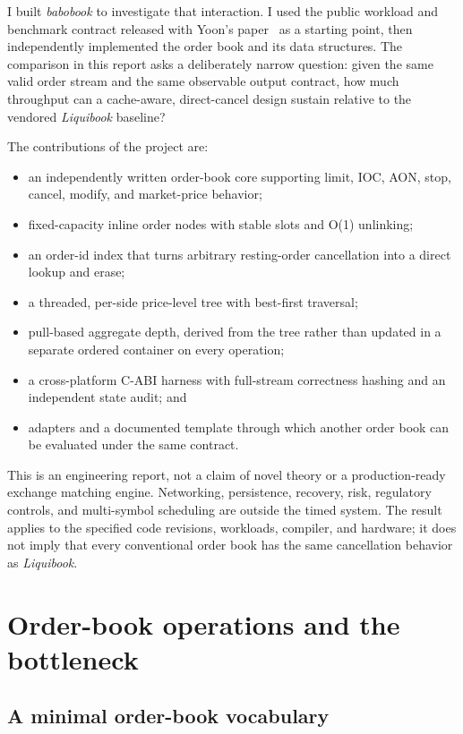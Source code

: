 \documentclass[10pt,twocolumn]{article}
\begin{document}
I built \textit{babobook} to investigate that interaction.  I used the public workload and
benchmark contract released with Yoon's paper~\cite{yoon2026} as a starting point, then
independently implemented the order book and its data
structures.  The comparison in this report asks a deliberately narrow question:
given the same valid order stream and the same observable output contract, how
much throughput can a cache-aware, direct-cancel design sustain relative to the
vendored \textit{Liquibook} baseline?

The contributions of the project are:
\begin{itemize}
  \item an independently written order-book core supporting limit, IOC, AON,
        stop, cancel, modify, and market-price behavior;
  \item fixed-capacity inline order nodes with stable slots and O(1) unlinking;
  \item an order-id index that turns arbitrary resting-order cancellation into
        a direct lookup and erase;
  \item a threaded, per-side price-level tree with best-first traversal;
  \item pull-based aggregate depth, derived from the tree rather than updated in
        a separate ordered container on every operation;
  \item a cross-platform C-ABI harness with full-stream correctness hashing and
        an independent state audit; and
  \item adapters and a documented template through which another order book can be
        evaluated under the same contract.
\end{itemize}

This is an engineering report, not a claim of novel theory or a production-ready
exchange matching engine.  Networking, persistence, recovery, risk, regulatory controls, and
multi-symbol scheduling are outside the timed system.  The result applies to the
specified code revisions, workloads, compiler, and hardware; it does not imply
that every conventional order book has the same cancellation behavior as
\textit{Liquibook}.

\section{Order-book operations and the bottleneck}

\subsection{A minimal order-book vocabulary}
\end{document}
